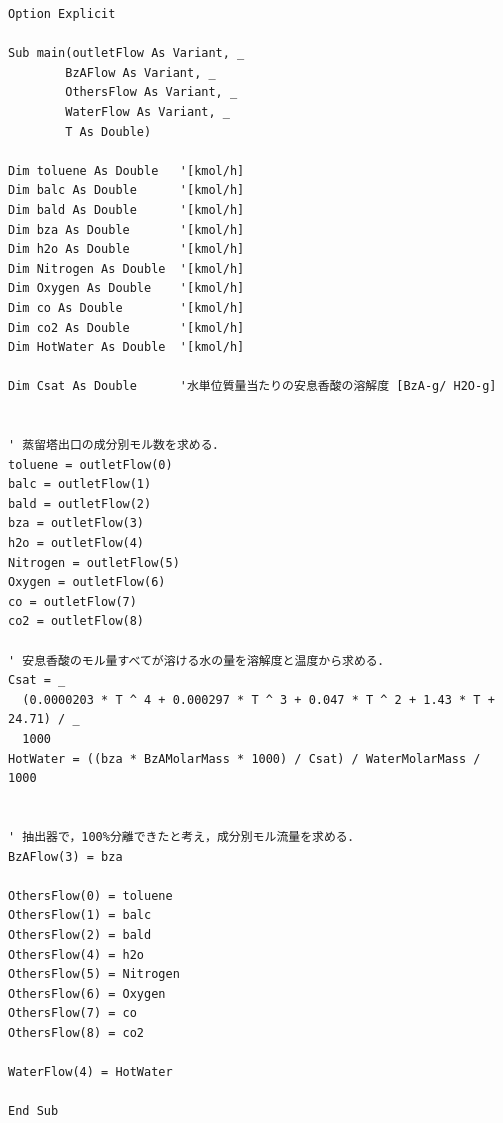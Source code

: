 \documentclass[a4j]{jsreport}
\begin{document}
\begin{lstlisting}[caption=抽出塔]
Option Explicit

Sub main(outletFlow As Variant, _
        BzAFlow As Variant, _
        OthersFlow As Variant, _
        WaterFlow As Variant, _
        T As Double)

Dim toluene As Double   '[kmol/h]
Dim balc As Double      '[kmol/h]
Dim bald As Double      '[kmol/h]
Dim bza As Double       '[kmol/h]
Dim h2o As Double       '[kmol/h]
Dim Nitrogen As Double  '[kmol/h]
Dim Oxygen As Double    '[kmol/h]
Dim co As Double        '[kmol/h]
Dim co2 As Double       '[kmol/h]
Dim HotWater As Double  '[kmol/h]

Dim Csat As Double      '水単位質量当たりの安息香酸の溶解度 [BzA-g/ H2O-g]


' 蒸留塔出口の成分別モル数を求める．
toluene = outletFlow(0)
balc = outletFlow(1)
bald = outletFlow(2)
bza = outletFlow(3)
h2o = outletFlow(4)
Nitrogen = outletFlow(5)
Oxygen = outletFlow(6)
co = outletFlow(7)
co2 = outletFlow(8)

' 安息香酸のモル量すべてが溶ける水の量を溶解度と温度から求める．
Csat = _
  (0.0000203 * T ^ 4 + 0.000297 * T ^ 3 + 0.047 * T ^ 2 + 1.43 * T + 24.71) / _
  1000
HotWater = ((bza * BzAMolarMass * 1000) / Csat) / WaterMolarMass / 1000


' 抽出器で，100%分離できたと考え，成分別モル流量を求める．
BzAFlow(3) = bza

OthersFlow(0) = toluene
OthersFlow(1) = balc
OthersFlow(2) = bald
OthersFlow(4) = h2o
OthersFlow(5) = Nitrogen
OthersFlow(6) = Oxygen
OthersFlow(7) = co
OthersFlow(8) = co2

WaterFlow(4) = HotWater

End Sub
\end{lstlisting}
\end{document}
